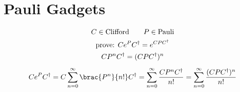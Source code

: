 \section{Pauli Gadgets}

\begin{equation*}
\begin{gathered}
    C \in \text{Clifford} \qquad P \in \text{Pauli} \\
    \text{prove: } Ce^PC^\dagger = e^{CPC^\dagger} \\
    CP^nC^\dagger  = (CPC^\dagger)^n \\[1ex]
    Ce^PC^\dagger = C \sum_{n=0}^\infty \brac{P^n}{n!} C^\dagger = \sum_{n=0}^\infty \frac{C P^n C^\dagger}{n!} = \sum_{n=0}^\infty \frac{(C P C^\dagger)^n}{n!}
\end{gathered}
\end{equation*}
